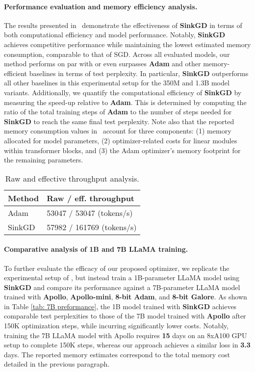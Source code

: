 \paragraph{Performance evaluation and memory efficiency analysis.} The results presented in~ demonstrate the effectiveness of \textbf{SinkGD} in terms of both computational efficiency and model performance. Notably, \textbf{SinkGD} achieves competitive performance while maintaining the lowest estimated memory consumption, comparable to that of SGD. Across all evaluated models, our method performs on par with or even surpasses \textbf{Adam} and other memory-efficient baselines in terms of test perplexity. In particular, \textbf{SinkGD} outperforms all other baselines in this experimental setup for the 350M and 1.3B model variants. Additionally, we quantify the computational efficiency of \textbf{SinkGD} by measuring the speed-up relative to \textbf{Adam}. This is determined by computing the ratio of the total training steps of \textbf{Adam} to the number of steps needed for \textbf{SinkGD} to reach the same final test perplexity. Note also that the reported memory consumption values in~ account for three components: (1) memory allocated for model parameters, (2) optimizer-related costs for linear modules within transformer blocks, and (3) the Adam optimizer's memory footprint for the remaining parameters.


\begin{table}[H]
\vspace{-0.5cm}
\centering
\caption{Raw and effective throughput analysis. }
\label{tab: throughput}
\begin{tabular}{l|l}
\hline
      Method   & Raw / eff. throughput \\ \hline
Adam & 53047 / 53047 (tokens/s)          \\
SinkGD     & 57982 / 161769  (tokens/s)         \\ \hline
\end{tabular}
\end{table}

\paragraph{Comparative analysis of 1B and 7B LLaMA training.} To further evaluate the efficacy of our proposed optimizer, we replicate the experimental setup of \cite{zhu2024apollo}, but instead train a 1B-parameter LLaMA model using \textbf{SinkGD} and compare its performance against a 7B-parameter LLaMA model trained with \textbf{Apollo}, \textbf{Apollo-mini}, \textbf{8-bit Adam}, and \textbf{8-bit Galore}. As shown in Table \ref{tab: 7B preformance}, the 1B model trained with \textbf{SinkGD} achieves comparable test perplexities to those of the 7B model trained with \textbf{Apollo} after 150K optimization steps, while incurring significantly lower costs. Notably, training the 7B LLaMA model with Apollo requires \textbf{15} days on an 8xA100 GPU setup to complete 150K steps, whereas our approach achieves a similar loss in \textbf{3.3} days. The reported memory estimates correspond to the total memory cost detailed in the previous paragraph.


